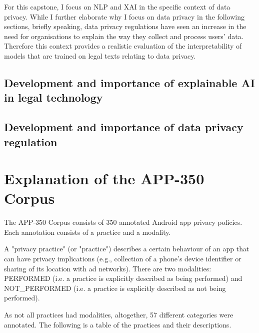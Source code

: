For this capstone, I focus on NLP and XAI in the specific context of data privacy. While I further elaborate why I focus on data privacy in the following sections, briefly speaking, data privacy regulations have seen an increase in the need for organisations to explain the way they collect and process users' data. Therefore this context provides a realistic evaluation of the interpretability of models that are trained on legal texts relating to data privacy.

\subsection{Development and importance of explainable AI in legal technology}



\subsection{Development and importance of data privacy regulation}


\section{Explanation of the APP-350 Corpus}
The APP-350 Corpus consists of 350 annotated Android app privacy policies. Each annotation consists of a practice and a modality.

A "privacy practice" (or "practice") describes a certain behaviour of an app that can have privacy implications (e.g., collection of a phone's device identifier or sharing of its location with ad networks). There are two modalities: PERFORMED (i.e. a practice is explicitly described as being performed) and NOT\_PERFORMED (i.e. a practice is explicitly described as not being performed).

As not all practices had modalities, altogether, 57 different categories were annotated. The following is a table of the practices and their descriptions.

